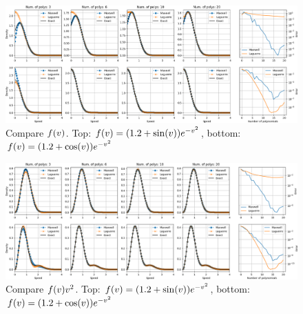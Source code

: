 \documentclass[10pt,letterpaper]{article}
\newcommand{\of}[1]{\mleft( #1 \mright)}
\begin{document}
\clearpage
\begin{figure}[!h]
\centering
\includegraphics[width=.99\textwidth]{plot/density_analytic.png}
\caption{Compare $f\of{v}$. Top: $f\of{v} = (1.2+\sin\of{v})e^{-v^2}$, bottom: $f\of{v} = (1.2+\cos\of{v})e^{-v^2}$}
\label{}
\end{figure}
\begin{figure}[!h]
\centering
\includegraphics[width=.99\textwidth]{plot/speed_analytic.png}
\caption{Compare $f\of{v} v^2$. Top: $f\of{v} = (1.2+\sin\of{v})e^{-v^2}$, bottom: $f\of{v} = (1.2+\cos\of{v})e^{-v^2}$}
\label{}
\end{figure}
\end{document}
